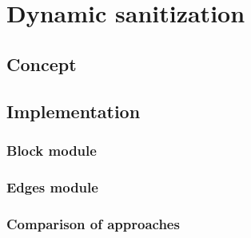 
\chapter{Dynamic sanitization}\label{chapter:dynamic_sanitization}

\section{Concept}


\section{Implementation}

\subsection{Block module}

\subsection{Edges module}

\subsection{Comparison of approaches}